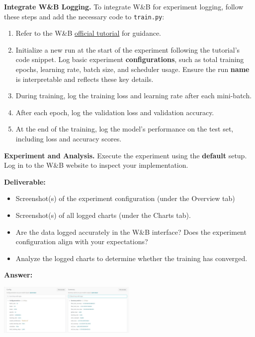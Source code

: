 \documentclass[11pt, oneside]{article}   	%
\begin{document}
\noindent \textbf{Integrate W\&B Logging.}
To integrate W\&B for experiment logging, follow these steps and add the necessary code to \texttt{train.py}:
\begin{enumerate}
    \item Refer to the W\&B \href{https://docs.wandb.ai/tutorials/experiments}{official tutorial} for guidance.
    \item Initialize a new run at the start of the experiment following the tutorial's code snippet. Log basic experiment \textbf{configurations}, such as total training epochs, learning rate, batch size, and scheduler usage. Ensure the run \textbf{name} is interpretable and reflects these key details.
    \item During training, log the training loss and learning rate after each mini-batch.
    \item After each epoch, log the validation loss and validation accuracy.
    \item At the end of the training, log the model's performance on the test set, including loss and accuracy scores.
\end{enumerate}

\noindent \textbf{Experiment and Analysis. }
Execute the experiment using the \textbf{default} setup. Log in to the W\&B website to inspect your implementation. 

\noindent\textbf{Deliverable:}
\begin{itemize}
    \item Screenshot(s) of the experiment configuration (under the Overview tab)
    \item Screenshot(s) of all logged charts (under the Charts tab).
    \item Are the data logged accurately in the W\&B interface? Does the experiment configuration align with your expectations?
    \item Analyze the logged charts to determine whether the training has converged.
\end{itemize}


\textbf{Answer:} \\
\begin{center}
    \includegraphics[width=0.5\textwidth]{report_pic/Experiment_Config.png}
\end{center}
\end{document}
